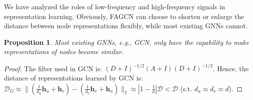 \documentclass[letterpaper]{article} %
\newtheorem{proposition}{Proposition}
\begin{document}
We have analyzed the roles of low-frequency and high-frequency signals in representation learning. Obviously, FAGCN can choose to shorten or enlarge the distance between node representations flexibly, while most existing GNNs cannot.

\begin{proposition}
	Most existing GNNs, e.g., GCN, only have the capability to make representations of nodes become similar.
\end{proposition}

\begin{proof}
	The filter used in GCN is: $(D+I)^{-1/2}(A+I)(D+I)^{-1/2}$.
	Hence, the distance of representations learned by GCN is: $\mathcal{D}_{G} \approx \| (\frac{1}{d_{u}} \mathbf{h}_{u} + \mathbf{h}_{v}) - (\frac{1}{d_{v}} \mathbf{h}_{v} + \mathbf{h}_{u}) \|_{2} \approx |1-\frac{1}{d}|\mathcal{D} < \mathcal{D}$ (s.t. $d_{u} \approx d_{v} \approx d$).
\end{proof}

\end{document}
